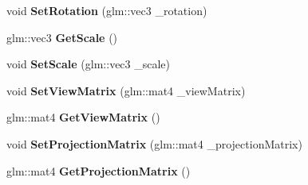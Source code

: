 \begin{DoxyCompactItemize}
\item 
\hypertarget{classModelLoader_a428ef884d300bc2b2d0706ad5b4198ca}{
void {\bfseries SetRotation} (glm::vec3 \_\-rotation)}
\label{classModelLoader_a428ef884d300bc2b2d0706ad5b4198ca}

\item 
\hypertarget{classModelLoader_afc0ecdf73f6c85752c9a690e38599b34}{
glm::vec3 {\bfseries GetScale} ()}
\label{classModelLoader_afc0ecdf73f6c85752c9a690e38599b34}

\item 
\hypertarget{classModelLoader_a96793c518f235d03349f642ad0aaebc1}{
void {\bfseries SetScale} (glm::vec3 \_\-scale)}
\label{classModelLoader_a96793c518f235d03349f642ad0aaebc1}

\item 
\hypertarget{classModelLoader_a50486cfb738a0f1431b8de2dad3f00ff}{
void {\bfseries SetViewMatrix} (glm::mat4 \_\-viewMatrix)}
\label{classModelLoader_a50486cfb738a0f1431b8de2dad3f00ff}

\item 
\hypertarget{classModelLoader_a9d3d71a699f08533e95a8af4530eaa04}{
glm::mat4 {\bfseries GetViewMatrix} ()}
\label{classModelLoader_a9d3d71a699f08533e95a8af4530eaa04}

\item 
\hypertarget{classModelLoader_a5a7bcbfb9d6c71c1ea58b150be4b991c}{
void {\bfseries SetProjectionMatrix} (glm::mat4 \_\-projectionMatrix)}
\label{classModelLoader_a5a7bcbfb9d6c71c1ea58b150be4b991c}

\item 
\hypertarget{classModelLoader_aa4f1ba034a863e7f9ca8628360e2384a}{
glm::mat4 {\bfseries GetProjectionMatrix} ()}
\label{classModelLoader_aa4f1ba034a863e7f9ca8628360e2384a}

\end{DoxyCompactItemize}
